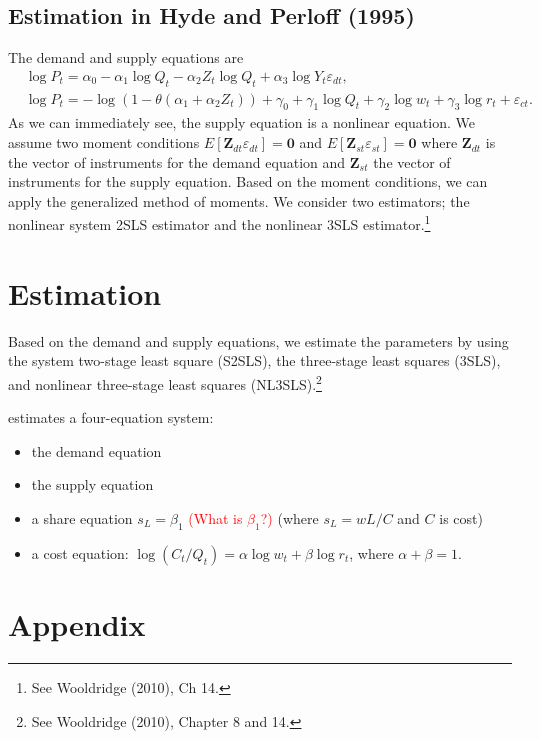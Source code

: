 \documentclass[11pt, a4paper]{article}
\numberwithin{figure}{section}
\theoremstyle{definition}
\newcommand{\0}{\mathbf{0}}
\newcommand{\bmZ}{\bm{Z}}
\begin{document}
\subsection{Estimation in Hyde and Perloff (1995)}
The demand and supply equations are
\begin{align*}
    &\log P_{t} = \alpha_0 - \alpha_1 \log Q_t - \alpha_2 Z_t\log Q_t + \alpha_3 \log Y_t \varepsilon_{dt},\\
    &\log P_t  = - \log(1 - \theta(\alpha_1 + \alpha_2 Z_t)) + \gamma_0 + \gamma_1 \log Q_t +  \gamma_2 \log w_t + \gamma_3 \log r_t + \varepsilon_{ct}.
\end{align*}
As we can immediately see, the supply equation is a nonlinear equation.
We assume two moment conditions $E[\bmZ_{dt} \varepsilon_{dt}] = \bm0 $ and $ E[\bmZ_{st} \varepsilon_{st}] =\bm0$ where $\bmZ_{dt}$ is the vector of instruments for the demand equation and $\bmZ_{st}$ the vector of instruments for the supply equation.
Based on the moment conditions, we can apply the generalized method of moments.
We consider two estimators; the nonlinear system 2SLS estimator and the nonlinear 3SLS estimator.\footnote{See Wooldridge (2010), Ch 14.}


\section{Estimation}
Based on the demand and supply equations, we estimate the  parameters by using the system two-stage least square (S2SLS), the three-stage least squares (3SLS), and nonlinear three-stage least squares (NL3SLS).\footnote{See Wooldridge (2010), Chapter 8 and 14.}


\citet{hyde1995can} estimates a four-equation system: 
\begin{itemize}
    \item the demand equation
    \item the supply equation
    \item a share equation $s_L = \beta_1$ \textcolor{red}{(What is $\beta_1$?)} (where $s_L = wL/C$ and $C$ is cost)
    \item a cost equation: $\log(C_t/Q_t) = \alpha \log w_t + \beta \log r_t$, where $ \alpha + \beta = 1$.
\end{itemize}





\section*{Appendix}





\end{document}
